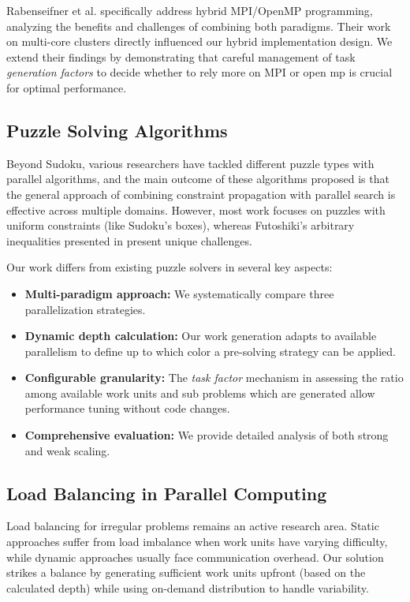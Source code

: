 Rabenseifner et al. \cite{Rabenseifner2009} specifically address hybrid MPI/OpenMP programming, analyzing the benefits and challenges of combining both paradigms. Their work on multi-core clusters directly influenced our hybrid implementation design. We extend their findings by demonstrating that careful management of task \textit{generation factors} to decide whether to rely more on MPI or open mp is crucial for optimal performance.

\subsection{Puzzle Solving Algorithms}
\label{subsec:puzzle_solving_algorithms}
Beyond Sudoku, various researchers have tackled different puzzle types with parallel algorithms, and the main outcome of these algorithms proposed is that the general approach of combining constraint propagation with parallel search is effective across multiple domains. However, most work focuses on puzzles with uniform constraints (like Sudoku's boxes), whereas Futoshiki's arbitrary inequalities presented in  present unique challenges.

Our work differs from existing puzzle solvers in several key aspects:
\begin{itemize}
    \item \textbf{Multi-paradigm approach:} We systematically compare three parallelization strategies.
    \item \textbf{Dynamic depth calculation:} Our work generation adapts to available parallelism to define up to which color a pre-solving strategy can be applied.
    \item \textbf{Configurable granularity:} The \textit{task factor} mechanism in assessing the ratio among available work units and sub problems which are generated allow performance tuning without code changes.
    \item \textbf{Comprehensive evaluation:} We provide detailed analysis of both strong and weak scaling.
\end{itemize}

\subsection{Load Balancing in Parallel Computing}
\label{subsec:load_balancing_in_parallel_computing}
Load balancing for irregular problems remains an active research area. Static approaches suffer from load imbalance when work units have varying difficulty, while dynamic approaches usually face communication overhead. Our solution strikes a balance by generating sufficient work units upfront (based on the calculated depth) while using on-demand distribution to handle variability.

